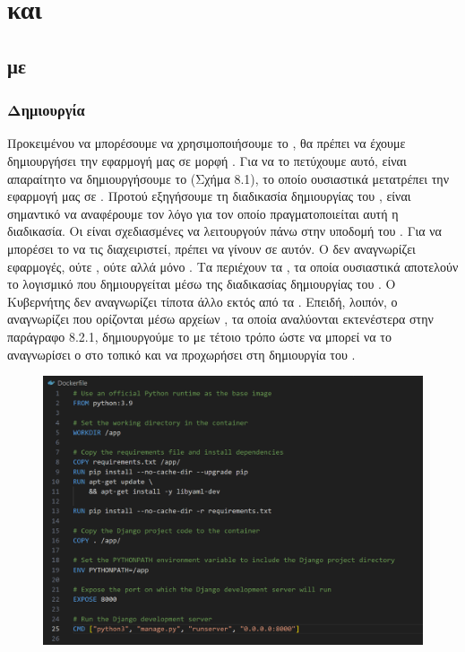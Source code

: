 \chapter{ και  }

\section{ με }

\subsection{Δημιουργία }

Προκειμένου να μπορέσουμε να χρησιμοποιήσουμε το , θα πρέπει να έχουμε δημιουργήσει την εφαρμογή μας σε μορφή . Για να το πετύχουμε αυτό, είναι απαραίτητο να δημιουργήσουμε το (Σχήμα 8.1), το οποίο ουσιαστικά μετατρέπει την εφαρμογή μας σε .
Προτού εξηγήσουμε τη διαδικασία δημιουργίας του , είναι σημαντικό να αναφέρουμε τον λόγο για τον οποίο πραγματοποιείται αυτή η διαδικασία. Οι  είναι σχεδιασμένες να λειτουργούν πάνω στην υποδομή του . Για να μπορέσει το  να τις διαχειριστεί, πρέπει να γίνουν  σε αυτόν.
Ο  δεν αναγνωρίζει εφαρμογές, ούτε , ούτε  αλλά μόνο . Τα  περιέχουν τα , τα οποία ουσιαστικά αποτελούν το λογισμικό που δημιουργείται μέσω της διαδικασίας δημιουργίας του . Ο Κυβερνήτης δεν αναγνωρίζει τίποτα άλλο εκτός από τα . Επειδή, λοιπόν, ο  αναγνωρίζει  που ορίζονται μέσω αρχείων , τα οποία αναλύονται εκτενέστερα στην παράγραφο 8.2.1, δημιουργούμε το  με τέτοιο τρόπο ώστε να μπορεί να το αναγνωρίσει ο  στο τοπικό  και να προχωρήσει στη δημιουργία του .


\begin{figure}[htb]
	\centering
	\includegraphics[width=1.0\textwidth]{graphics/dockerfile.png}
	\caption{}
\end{figure}

